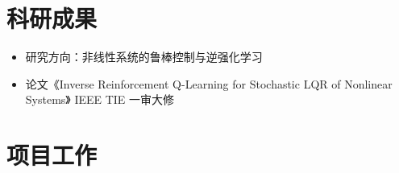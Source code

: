 \documentclass{logo-cv}
\begin{document}
\section{科研成果}
\begin{itemize}
    \item 研究方向：非线性系统的鲁棒控制与逆强化学习
    \item 
            论文《Inverse Reinforcement Q-Learning for Stochastic LQR of Nonlinear Systems》  IEEE TIE 一审大修
\end{itemize}

\section{项目工作}
\end{document}
